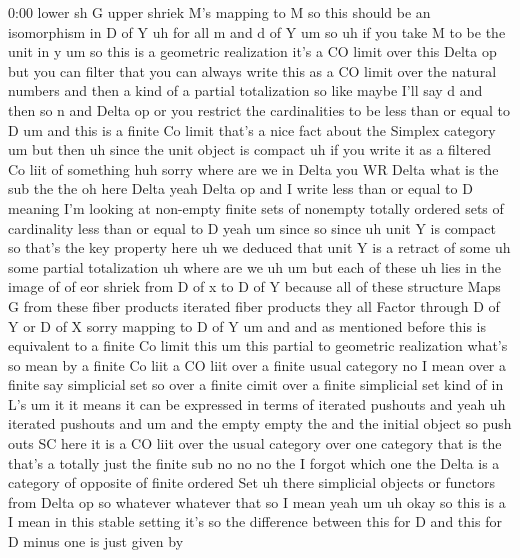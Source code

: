 \begin{unfinished}{0:00}
lower  sh  G  upper  shriek  M's  mapping  to  M
so  this  should  be  an  isomorphism  in  D  of
Y  uh  for  all  m  and  d  of
Y
um
so  uh  if  you  take
M  to  be  the  unit  in  y  um  so  this  is  a
geometric  realization  it's  a  CO  limit
over  this  Delta  op  but  you  can  filter
that  you  can  always  write  this  as  a  CO
limit  over  the  natural  numbers  and  then
a  kind  of  a  partial  totalization  so  like
maybe  I'll  say  d  and  then  so  n  and  Delta
op  or  you  restrict  the  cardinalities  to
be  less  than  or  equal  to  D
um  and  this  is  a  finite  Co
limit  that's  a  nice  fact  about  the
Simplex  category  um  but  then  uh  since
the  unit  object  is
compact  uh  if  you  write  it  as  a  filtered
Co  liit  of  something
huh  sorry  where  are  we  in
Delta  you  WR  Delta  what  is  the  sub  the
the
oh  here  Delta  yeah  Delta  op  and  I  write
less  than  or  equal  to  D  meaning  I'm
looking  at  non-empty  finite  sets
of  nonempty  totally  ordered  sets  of
cardinality  less  than  or  equal  to  D
yeah
um  since  so
since  uh  unit  Y  is
compact  so  that's  the  key  property  here
uh  we  deduced  that  unit  Y  is  a
retract  of
some  uh  some  partial
totalization  uh  where  are
we
uh  um  but  each  of
these  uh  lies  in  the  image  of  of  eor
shriek
from  D  of  x  to  D  of  Y  because  all  of
these  structure  Maps  G  from  these  fiber
products  iterated  fiber  products  they
all  Factor  through  D  of  Y  or  D  of  X
sorry  mapping  to  D  of  Y  um  and  and  as
mentioned  before  this  is  equivalent  to  a
finite  Co  limit  this  um  this  partial  to
geometric  realization  what's  so  mean  by
a  finite  Co  liit  a  CO  liit  over  a  finite
usual  category  no  I  mean  over  a  finite
say  simplicial  set  so  over  a  finite
cimit  over  a  finite  simplicial  set  kind
of  in  L's
um
it  it  means  it  can  be  expressed  in  terms
of  iterated  pushouts  and  yeah  uh
iterated  pushouts  and  um  and  the
empty  empty  the  and  the  initial  object
so
push  outs  SC  here  it  is  a  CO  liit  over
the  usual  category  over  one  category
that  is  the  that's  a  totally  just
the
finite  sub  no  no  no
the  I  forgot  which  one  the  Delta  is  a
category  of  opposite  of  finite  ordered
Set
uh  there  simplicial  objects  or  functors
from  Delta  op  so  whatever  whatever  that
so  I  mean  yeah
um  uh  okay  so  this  is
a  I  mean  in  this  stable  setting  it's  so
the  difference  between  this  for  D  and
this  for  D  minus  one  is  just  given  by

\end{unfinished}
